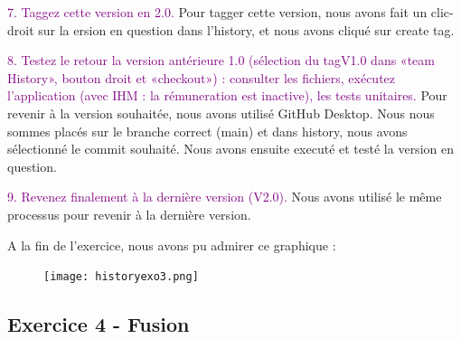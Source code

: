\documentclass{article}
\begin{document}
\bigskip

\textcolor{Purple}{7. Taggez cette version en 2.0.}
\newline
Pour tagger cette version, nous avons fait un clic-droit sur la ersion en question dans l'history, et nous avons cliqué sur create tag.

\bigskip

\textcolor{Purple}{8. Testez le retour la version antérieure 1.0 (sélection du tagV1.0 dans «team History», bouton droit et «checkout») : consulter les fichiers, exécutez l’application (avec IHM : la rémuneration est inactive), les tests unitaires.}
\newline
Pour revenir à la version souhaitée, nous avons utilisé GitHub Desktop. Nous nous sommes placés sur le branche correct (main) et dans history, nous avons sélectionné le commit souhaité. Nous avons ensuite executé et testé la version en question.

\bigskip

\textcolor{Purple}{9. Revenez finalement à la dernière version (V2.0).}
\newline
Nous avons utilisé le même processus pour revenir à la dernière version.

\bigskip


A la fin de l'exercice, nous avons pu admirer ce graphique :

\begin{figure}[h]
\texttt{[image: historyexo3.png]}
\end{figure}

\subsection{Exercice 4 - Fusion}

\bigskip
\end{document}
